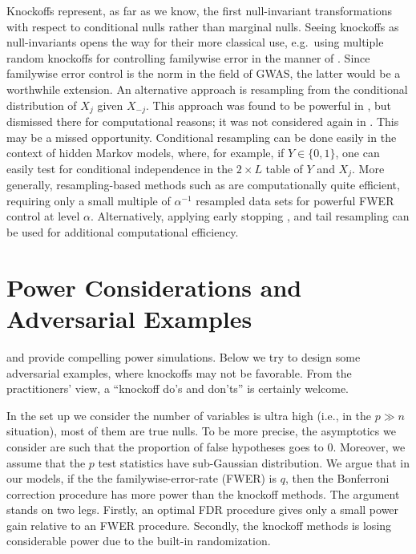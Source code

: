 \documentclass[article,lineno]{biometrika}
\begin{document}
	Knockoffs represent, as far as we know, the first null-invariant transformations with respect to conditional nulls rather than marginal nulls.
	Seeing knockoffs as null-invariants opens the way for their more classical use, e.g.\ using multiple random knockoffs for controlling familywise error in the manner of \cite{Westfall1993}. Since familywise error control is the norm in the field of GWAS, the latter would be a worthwhile extension. 
	An alternative approach is resampling from the conditional distribution of $X_j$ given $X_{-j}$. 
	This approach was found to be powerful in \cite[Fig.3]{CandesPanninggoldmodelX2018}, but dismissed there for computational reasons; it was not considered again in \cite{SesiaGenehuntinghidden}. 
	This may be a missed opportunity. 
	Conditional resampling can be done easily in the context of hidden Markov models, where, for example, if $Y\in \{0,1\}$, one can easily test for conditional independence in the $2\times L$ table of $Y$ and $X_j$. 
	More generally, resampling-based methods such as \cite{Westfall1993} are computationally quite efficient, requiring only a small multiple of $\alpha^{-1}$ resampled data sets for powerful FWER control at level $\alpha$. 
	Alternatively, applying early stopping \citep[e.g.][]{jiang2012statistical}, and tail resampling \cite[e.g.][]{yu2011efficient} can be used for additional computational efficiency.
		
	
	
	
	
	\section{Power Considerations and Adversarial Examples}
	
	\cite{SesiaGenehuntinghidden} and \cite{CandesPanninggoldmodelX2018} provide compelling power simulations.
	Below we try to design some adversarial examples, where knockoffs may not be favorable. 
	From the practitioners' view, a ``knockoff do's and don'ts'' is certainly welcome. 
	
	In the set up we consider the number of variables is ultra high (i.e., in the $p\gg n$ situation), most of them are true nulls. To be more precise, the asymptotics we consider are such that 
	the proportion of false hypotheses 
	goes to 0. Moreover, we assume that the $p$ test statistics have sub-Gaussian distribution. We argue that in our models, if the the familywise-error-rate (FWER) is $q$, then  the Bonferroni correction procedure has more power than the knockoff methods. The argument stands on two legs. Firstly, an optimal FDR procedure gives only a small power gain relative to an FWER procedure. Secondly, the knockoff methods is losing considerable power due to the built-in randomization.
	
\end{document}
